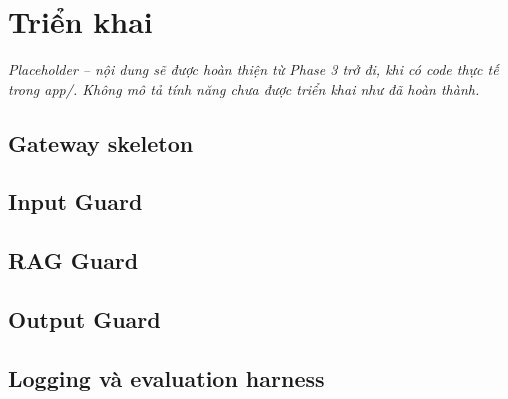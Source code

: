 \chapter{Triển khai}
\label{ch:trien-khai}

\textit{Placeholder -- nội dung sẽ được hoàn thiện từ Phase 3 trở đi, khi có code thực tế trong app/. Không mô tả tính năng chưa được triển khai như đã hoàn thành.}

\section{Gateway skeleton}

\section{Input Guard}

\section{RAG Guard}

\section{Output Guard}

\section{Logging và evaluation harness}

